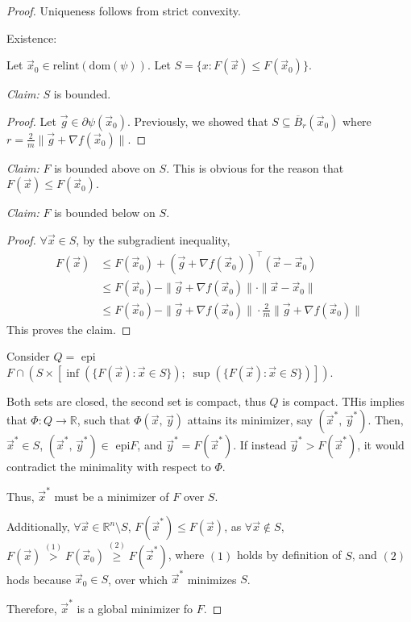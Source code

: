 \documentclass{article}
\newcommand{\R}{\mathbb{R}}             %
\newcommand{\x}{\vec{x}}                %
\newcommand{\y}{\vec{y}}                %
\newcommand{\dom}{\text{dom}}           %
\newcommand{\relint}{\text{relint}}     %
\begin{document}
\begin{proof}
    Uniqueness follows from strict convexity.

    Existence:

    Let $\x_0 \in \relint(\dom(\psi))$. Let $S = \{x : F(\x) \leq F(\x_0)\}$.

    \textit{Claim:} $S$ is bounded.
    \begin{proof}
        Let $\vec{g} \in \partial \psi(\x_0)$. Previously, we showed that $S \subseteq \overline{B}_r(\x_0)$ where $r = \frac{2}{m}\|\vec{g} + \nabla f(\x_0)\|$.
    \end{proof}

    \textit{Claim:} $F$ is bounded above on $S$. This is obvious for the reason that $F(\x) \leq F(\x_0)$.

    \textit{Claim:} $F$ is bounded below on $S$.

    \begin{proof}
        $\forall \x \in S$, by the subgradient inequality,
        \begin{align*}
            F(\x) &\leq F(\x_0) + (\vec{g} + \nabla f(\x_0))^\top(\x - \x_0) \\
            &\leq F(\x_0) - \|\vec{g} + \nabla f(\x_0)\| \cdot \|\x - \x_0\| \tag{Cauchy-Schwartz inequality} \\
            &\leq F(\x_0) - \|\vec{g} + \nabla f(\x_0)\| \cdot \frac{2}{m}\|\vec{g} + \nabla f(\x_0)\| \tag{by the earlier claim}
        \end{align*}
        This proves the claim.
    \end{proof}

    Consider $Q =$ epi$F \cap \left(S \times \left[\inf\left(\{F(\x) : \x \in S\}\right);\; \sup\left(\{F(\x) : \x \in S\}\right)\right]\right)$.


    Both sets are closed, the second set is compact, thus $Q$ is compact. THis implies  that $\Phi \colon Q \to \R$, such that $\Phi(\x,\, \y)$ attains its minimizer, say $(\x^*,\, \y^*)$. Then, $\x^* \in S$, $(\x^*,\, \y^*) \in$ epi$F$, and $\y^* = F(\x^*)$. If instead $\y^* > F(\x^*)$, it would contradict the minimality with respect to $\Phi$.

    Thus, $\x^*$ must be a minimizer of $F$ over $S$.

    Additionally, $\forall \x \in \R^n \setminus S$, $F(\x^*) \leq F(\x)$, as $\forall \x \notin S$, $F(\x) \overset{(1)}{>} F(\x_0) \overset{(2)}{\geq} F(\x^*)$, where $(1)$ holds by definition of $S$, and $(2)$ hods because $\x_0 \in S$, over which $\x^*$ minimizes $S$.

    Therefore, $\x^*$ is a global minimizer fo $F$.
\end{proof}
\end{document}
